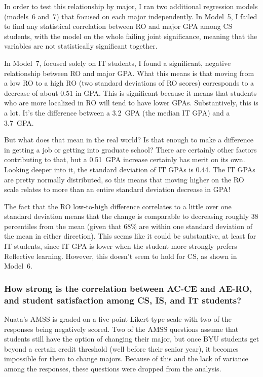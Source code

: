 In order to test this relationship by major, I ran two additional regression models (models~6 and~7) that focused on each major independently. In Model~5, I failed to find any statistical correlation between RO and major GPA among CS students, with the model on the whole failing joint significance, meaning that the variables are not statistically significant together.

In Model~7, focused solely on IT students, I found a significant, negative relationship between RO and major GPA. What this means is that moving from a low RO to a high RO (two standard deviations of RO scores) corresponds to a decrease of about $0.51$ in GPA. This is significant because it means that students who are more localized in RO will tend to have lower GPAs. Substantively, this is a lot. It's the difference between a 3.2~GPA (the median IT GPA) and a 3.7~GPA.

But what does that mean in the real world? Is that enough to make a difference in getting a job or getting into graduate school? There are certainly other factors contributing to that, but a 0.51~GPA increase certainly has merit on its own. Looking deeper into it, the standard deviation of IT GPAs is 0.44. The IT GPAs are pretty normally distributed, so this means that moving higher on the RO scale relates to more than an entire standard deviation decrease in GPA!

The fact that the RO low-to-high difference correlates to a little over one standard deviation means that the change is comparable to decreasing roughly 38 percentiles from the mean (given that 68\% are within one standard deviation of the mean in either direction). This seems like it could be substantive, at least for IT students, since IT GPA is lower when the student more strongly prefers Reflective learning. However, this doesn't seem to hold for CS, as shown in Model~6.

\subsubsection{How strong is the correlation between AC-CE and AE-RO, and student satisfaction among CS, IS, and IT students?}
Nuata's AMSS is graded on a five-point Likert-type scale with two of the responses being negatively scored. Two of the AMSS questions assume that students still have the option of changing their major, but once BYU students get beyond a certain credit threshold (well before their senior year), it becomes impossible for them to change majors. Because of this and the lack of variance among the responses, these questions were dropped from the analysis.


